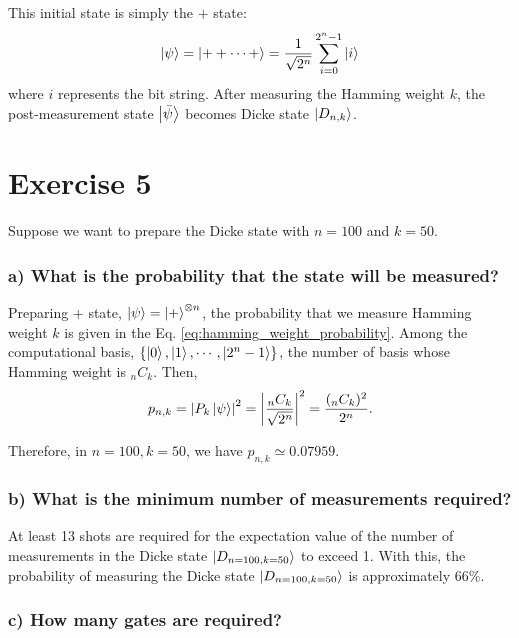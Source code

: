 \documentclass[a4paper, 11pt]{article}
\begin{document}
This initial state is simply the $+$ state:
\begin{equation}
	\ket{\psi} = \ket{++ \cdots +} = \frac{1}{\sqrt{2^n}} \sum_{i=0}^{2^n -1} \ket{i}
\end{equation}
where $i$ represents the bit string. After measuring the Hamming weight $k$, the post-measurement state $\ket{\bar{\psi}}$ becomes Dicke state $\ket{D_{n,k}}$.

\section*{Exercise 5}
Suppose we want to prepare the Dicke state with $n = 100$ and $k = 50$.

\subsubsection*{a) What is the probability that the state will be measured?}
Preparing + state, $\ket{\psi} = \ket{+}^{\otimes n}$, the probability that we measure Hamming weight $k$ is given in the Eq. \ref{eq:hamming_weight_probability}.
Among the computational basis, $\{\ket{0}, \ket{1}, \cdots, \ket{2^n -1}\}$, the number of basis whose Hamming weight is ${}_n C_{k}$. Then,
\begin{equation}
	p_{n,k} = \left| P_{k} \ket{\psi} \right|^{2} = \left| \frac{{}_n C_{k}}{\sqrt{2^n}} \right|^{2} = \frac{({}_n C_k)^{2}}{2^n}.
\end{equation}

Therefore, in $n=100, k=50$, we have $p_{n,k} \simeq 0.07959$. 

\subsubsection*{b) What is the minimum number of measurements required?}

At least 13 shots are required for the expectation value of the number of measurements in the Dicke state $\ket{D_{n=100,k=50}}$ to exceed 1. 
With this, the probability of measuring the Dicke state $\ket{D_{n=100,k=50}}$ is approximately 66\%.


\subsubsection*{c) How many gates are required?}
\end{document}
